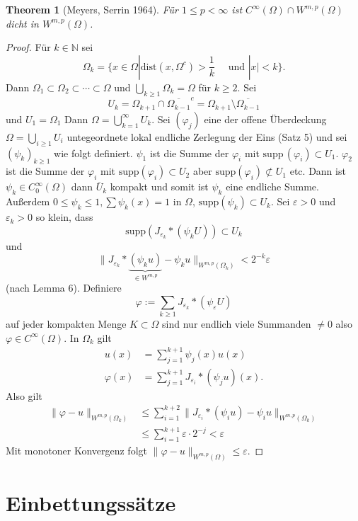 \documentclass[
paper=a4,
bibtotocnumbered,
liststotocnumbered,
tablecaptionabove,
pointlessnumbers,
twoside,
openright,
10pt
]
{report}
\newcommand{\supp}{\mathrm{supp}\,}
\let\phi\varphi
\newtheorem{thm}{Theorem}[chapter]
\theoremstyle{definition}
\numberwithin{equation}{chapter}
\begin{document}
\begin{thm}[Meyers, Serrin 1964]
Für $1\le p <\infty$ ist $C^\infty(\Omega) \cap W^{m,p}(\Omega)$ dicht in $W^{m,p}(\Omega)$.
\end{thm}
\begin{proof}
Für $k\in \mathbb N$ sei
$$
\Omega_k = \{x\in \Omega |\text{dist} (x, \Omega^c) >\frac{1}{k} \quad \text{ und } |x| <k\}.
$$
Dann $\Omega_1 \subset \Omega_2 \subset \cdots \subset \Omega$ und $\bigcup_{k\ge 1} \Omega_k = \Omega$ für 
$k\ge 2$. Sei $$U_k = \Omega_{k+1} \cap \overline{\Omega_{k-1}}^c = \Omega_{k+1} \setminus \overline{\Omega_{k-1}}$$
und $U_1= \Omega_1$ Dann $\Omega = \bigcup_{k=1}^\infty U_k$. Sei $(\phi_j)$ eine der offene Überdeckung $\Omega = \bigcup_{i \ge 1} U_i$ untegeordnete lokal endliche Zerlegung der Eins (Satz 5) und sei $(\psi_k)_{k\ge 1}$ wie folgt definiert. $\psi_1$ ist die Summe der $\phi_i$ mit $\supp(\phi_i) \subset U_1$. $\phi_2$ ist die Summe der $\phi_i$ mit $\text{supp}(\phi_i) \subset U_2$ aber $\text{supp}(\phi_i) \not \subset U_1$ etc.  Dann ist $\psi_k \in C_0^\infty(\Omega)$ dann $\overline U_k$ kompakt und somit ist $\psi_k$ eine endliche Summe. Außerdem $0 \le \psi_k \le 1, \sum \psi_k(x)=1$ in $\Omega$, $\text{supp}(\psi_k) \subset U_k$.  Sei $\varepsilon>0$ und $\varepsilon_k >0$ so klein, dass  
$$
\text{supp}(J_{\varepsilon_k} * ( \psi_k U)) \subset U_k
$$
und $$\| J_{\varepsilon_k}*\underbrace{(\psi_k u)}_{\in W^{m,p}}- \psi_k u\|_{W^{m,p}(\Omega_k)} < 2^{-k}\varepsilon$$
(nach Lemma 6). Definiere 
$$
\phi:= \sum_{k\ge 1} J_{\varepsilon_k} * (\psi_\varepsilon U)
$$
auf jeder kompakten Menge $K\subset \Omega$ sind nur endlich viele Summanden $\neq 0$ also $\phi \in C^\infty(\Omega)$. In $\Omega_k$ gilt
\begin{align*}
u(x) &= \sum_{j=1}^{k+1} \psi_j(x) u(x)\\
\phi(x) &= \sum_{j=1}^{k+1} J_{\varepsilon_i} * (\psi_j u) (x).
\end{align*}
Also gilt 
\begin{align*}
\| \phi - u \| _{W^{m,p}(\Omega_k)} &\le \sum_{i=1}^{k+2} \| J_{\varepsilon_i} * (\psi_i u) - \psi_i u\|_{W^{m,p}(\Omega_k)} \\
&\le \sum_{i=1}^{k+1} \varepsilon \cdot 2^{-j} < \varepsilon
\end{align*}
Mit monotoner Konvergenz folgt $\|\phi- u\|_{W^{m,p}(\Omega)}\le \varepsilon$.
\end{proof}
\chapter{Einbettungssätze}
\end{document}
